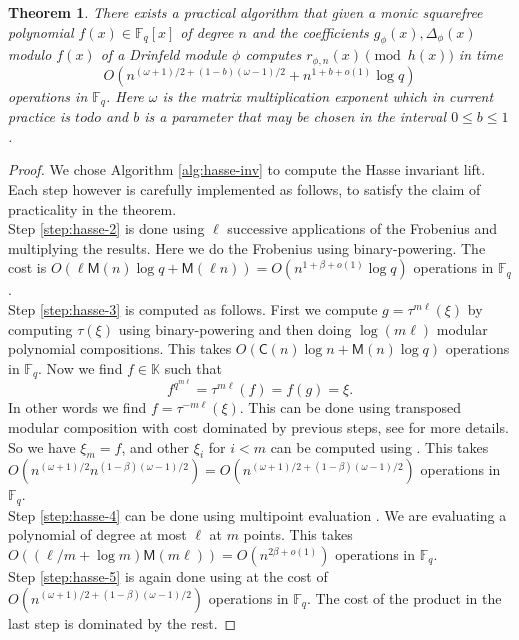 \documentclass{article}
\theoremstyle{plain}
\newtheorem{theorem}{Theorem}
\theoremstyle{definition}
\def\F{\ensuremath{\mathbb{F}}}
\def\K{\ensuremath{\mathbb{K}}}
\def\MM{\ensuremath{\mathsf{M}}}
\def\CC{\ensuremath{\mathsf{C}}}
\begin{document}
\begin{theorem}
	\label{theo:hasse-inv}
	There exists a practical algorithm that given a monic squarefree polynomial $f(x) \in \F_q[x]$ of degree $n$ and the coefficients $g_\phi(x),\Delta_{\phi}(x)$ modulo $f(x)$ of a Drinfeld module $\phi$ computes $r_{\phi,n}(x) \pmod {h(x)}$ in time
	\[O(n^{(\omega + 1) / 2 + (1 - b)(\omega - 1) / 2} + n^{1 + b + o(1)}\log q)\] operations in $\F_q$. Here $\omega$ is the matrix multiplication exponent which in current practice is $to do$ and $b$ is a parameter that may be chosen in the interval $0\leq b \leq 1$.	
\end{theorem}
\begin{proof}
We chose Algorithm \ref{alg:hasse-inv} to compute the Hasse invariant lift. Each step however is carefully implemented as follows, to satisfy the claim of practicality in the theorem.\\ 

\noindent Step \ref{step:hasse-2} is done using $\ell$ successive applications of the Frobenius and multiplying the results. Here we do the Frobenius using binary-powering. The cost is $O(\ell\MM(n)\log q + \MM(\ell n)) = O(n^{1 + \beta + o(1)}\log q)$ operations in $\F_q$. \\

\noindent Step \ref{step:hasse-3} is computed as follows. First we compute $g = \tau^{m\ell}(\xi)$ by 
computing $\tau(\xi)$ using binary-powering and then doing $\log (m\ell)$ modular polynomial compositions. This takes $O(\CC(n)\log n + \MM(n)\log q)$ operations in $\F_q$. Now we find $f \in \K$ such that \[f^{q^{m\ell}} = \tau^{m\ell}(f) = f(g) = \xi.\]
In other words we find $f = \tau^{-m\ell}(\xi)$. This can be done using transposed modular composition with cost dominated by previous steps, see \cite{DeDoSc2014} for more details. So we have $\xi_m = f$, and other $\xi_i$ for $i < m$ can be computed using \cite[Lemma 3]{ks}. This takes $O(n^{(\omega + 1) / 2}n^{(1 - \beta)(\omega - 1) / 2}) = O(n^{(\omega + 1) / 2 + (1 - \beta)(\omega - 1) / 2})$ operations in $\F_q$. \\

\noindent Step \ref{step:hasse-4} can be done using multipoint evaluation \cite{vzGG}. We are evaluating a polynomial of degree at most $\ell$ at $m$ points. This takes $O((\ell / m + \log m) \MM(m\ell)) = O(n^{2\beta + o(1)})$ operations in $\F_q$.\\ 

\noindent Step \ref{step:hasse-5} is again done using \cite[Lemma 3]{ks} at the cost of $O(n^{(\omega + 1) / 2 + (1 - \beta)(\omega - 1) / 2})$ operations in $\F_q$. The cost of the product in the last step is dominated by the rest. %
\end{proof}






\end{document}
